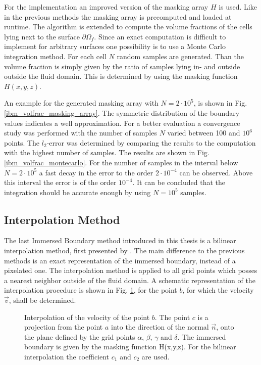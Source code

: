 For the implementation an improved version of the masking array $H$ is used.
Like in the previous methods the masking array is precomputed and loaded at runtime. The algorithm is extended to compute the
volume fractions of the cells lying next to the surface $\partial\Omega_f$.
Since an exact computation is difficult to implement for arbitrary surfaces one possibility is to use a Monte Carlo integration method.
For each cell $N$ random samples are generated. Than the volume fraction is simply given by the ratio of samples lying in- and outside outside the fluid domain.
This is determined by using the masking function $H(x, y, z)$.

An example for the generated masking array with $N=2\cdot10^{5}$, is shown in Fig. \ref{ibm_volfrac_masking_array}.
The symmetric distribution of the boundary values indicates
a well approximation. For a better evaluation a convergence study was performed with the number of samples $N$ varied between 100 and $10^6$ points.
The $l_2$-error was determined by comparing the results to the computation with the highest number of samples.
The results are shown in Fig. \ref{ibm_volfrac_montecarlo}.
For the number of samples in the interval below $N=2\cdot10^5$  a fast decay in the error to the order $2\cdot10^{-4}$ can be observed.
Above this interval the error is of the order $10^{-4}$.
It can be concluded that the integration should be accurate enough by using $N=10^5$ samples.

\clearpage
\subsection{Interpolation Method}

The last Immersed Boundary method introduced in this thesis is a bilinear interpolation method, first presented by \citep{Gilmanov2003}.
The main difference to the previous methods is an exact representation of the immersed boundary, instead of a pixelated one.
The interpolation method is applied to all grid points which posses a nearest neighbor outside of the fluid domain.
A schematic representation of the interpolation procedure is shown in Fig. \ref{ibm:ip_method_algo},
for the point $b$, for which the velocity $\vec{v}$, shall be determined.

\begin{figure}[!bp]
      \centering
      \caption{Interpolation of the velocity of the point $b$. The point $c$ is a projection from the point $a$ into the direction of the normal $\vec{n}$,
       onto the plane defined by the grid points $\alpha$, $\beta$, $\gamma$ and $\delta$. The immersed boundary is given by the masking function H(x,y,z).
       For the bilinear interpolation the coefficient $c_1$ and $c_2$ are used.
      }
    \label{ibm:ip_method_algo}
\end{figure}

